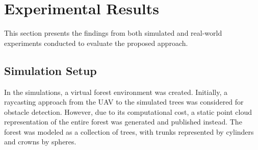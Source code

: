 

            
    
    \section{Experimental Results}
        This section presents the findings from both simulated and real-world experiments conducted to evaluate the proposed approach.
        \subsection{Simulation Setup}
            In the simulations, a virtual forest environment was created. 
            Initially, a raycasting approach from the UAV to the simulated trees was considered for obstacle detection. 
            However, due to its computational cost, a static point cloud representation of the entire forest was generated and published instead. 
            The forest was modeled as a collection of trees, with trunks represented by cylinders and crowns by spheres.

